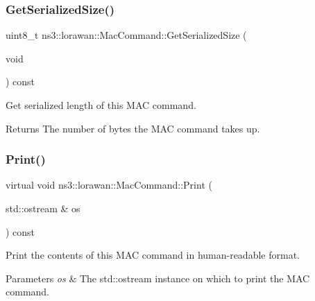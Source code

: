 \subsubsection{\texorpdfstring{Get\+Serialized\+Size()}{GetSerializedSize()}}
{\footnotesize\ttfamily uint8\+\_\+t ns3\+::lorawan\+::\+Mac\+Command\+::\+Get\+Serialized\+Size (\begin{DoxyParamCaption}\item[{void}]{ }\end{DoxyParamCaption}) const\hspace{0.3cm}{\ttfamily [virtual]}}

Get serialized length of this M\+AC command.

\begin{DoxyReturn}{Returns}
The number of bytes the M\+AC command takes up. 
\end{DoxyReturn}
\mbox{\label{classns3_1_1lorawan_1_1MacCommand_a6bf88db38dab7dcd817811a9fb59f920}} 
\subsubsection{\texorpdfstring{Print()}{Print()}}
{\footnotesize\ttfamily virtual void ns3\+::lorawan\+::\+Mac\+Command\+::\+Print (\begin{DoxyParamCaption}\item[{std\+::ostream \&}]{os }\end{DoxyParamCaption}) const\hspace{0.3cm}{\ttfamily [pure virtual]}}

Print the contents of this M\+AC command in human-\/readable format.


\begin{DoxyParams}{Parameters}
{\em os} & The std\+::ostream instance on which to print the M\+AC command. \\
\hline
\end{DoxyParams}



